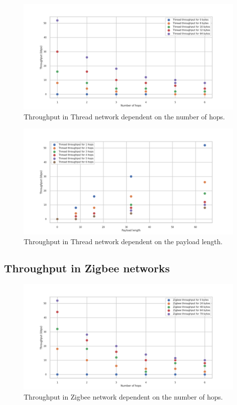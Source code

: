 \begin{figure}[H]
    \centering
    \includegraphics[scale=0.45]{images/Thread_Throughput_all.png}
    \caption{Throughput in Thread network dependent on the number of hops.}
    \label{fig:thread_throughput_all}
\end{figure}

\begin{figure}[H]
    \centering
    \includegraphics[scale=0.45]{images/Thread_Throughput_vs_length.png}
    \caption{Throughput in Thread network dependent on the payload length. }
    \label{fig:thread_throughput_length}
\end{figure}


\subsection{Throughput in Zigbee networks}

\begin{figure}[H]
    \centering
    \includegraphics[scale=0.45]{images/Zigbee_Throughput_all.png}
    \caption{Throughput in Zigbee network dependent on the number of hops.}
    \label{fig:zigbee_throughput_all}
\end{figure}

